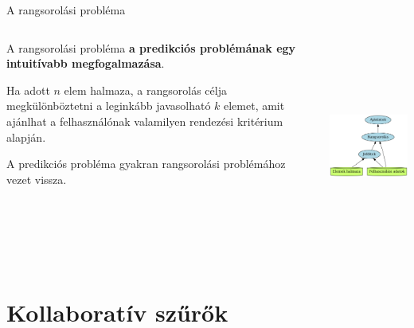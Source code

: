 \documentclass[english, aspectratio=169]{beamer}
\makeatletter
\let\origtableofcontents=\tableofcontents
\def\tableofcontents{\@ifnextchar[{\origtableofcontents}{\gobbletableofcontents}}
\def\gobbletableofcontents#1{\origtableofcontents}
\makeatother
\begin{document}
\begin{frame}{A rangsorolási probléma}
\begin{columns}
\begin{column}{.5\textwidth}
A rangsorolási probléma \textbf{a predikciós problémának egy intuitívabb megfogalmazása}.\par\smallskip
Ha adott $n$ elem halmaza, a rangsorolás célja megkülönböztetni a leginkább javasolható $k$ elemet, amit ajánlhat a felhasználónak valamilyen rendezési kritérium alapján.\par\smallskip
A predikciós probléma gyakran rangsorolási problémához vezet vissza.
\end{column}
\begin{column}{.5\textwidth}
\begin{center}
\includegraphics[width=7cm, height=7cm, keepaspectratio]{graphs/recommender_3.png}
\end{center}
\end{column}
\end{columns}
\end{frame}

\section{Kollaboratív szűrők}

\begin{frame}
\tableofcontents[currentsection]
\end{frame}
\end{document}
